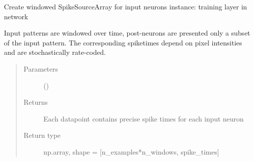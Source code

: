 \documentclass[letterpaper,10pt,english]{sphinxmanual}
\begin{document}
\begin{fulllineitems}
\label{\detokenize{SpikingConvNet:SpikingConvNet.algorithms.input_windowed_spikes}}
Create windowed SpikeSourceArray for input neurons
instance: training layer in network

Input patterns are windowed over time, post-neurons are presented only
a subset of the input pattern. The corresponding spiketimes depend on
pixel intensities and are stochastically rate-coded.
\begin{quote}\begin{description}
\item[{Parameters}] \leavevmode
{} ()

\item[{Returns}] \leavevmode
{} \textendash{} Each datapoint contains precise spike times for each input neuron

\item[{Return type}] \leavevmode
np.array, shape = {[}n\_examples*n\_windows, spike\_times{]}

\end{description}\end{quote}

\end{fulllineitems}

\end{document}
